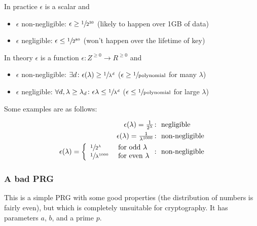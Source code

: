 \documentclass[10pt,a4paper]{report}
\begin{document}
In practice $\epsilon$ is a scalar and
\begin{itemize}
    \item $\epsilon$ non-negligible: $\epsilon \geq \sfrac{1}{2^{30}}$ (likely to happen over 1GB
        of data)
    \item $\epsilon$ negligible: $\epsilon \leq \sfrac{1}{2^{80}}$ (won't happen over the lifetime
        of key)
\end{itemize}

\noindent
In theory $\epsilon$ is a function $\epsilon \colon Z^{\geq 0} \to R^{\geq 0}$ and
\begin{itemize}
    \item $\epsilon$ non-negligible: $\exists d \colon \epsilon(\lambda) \geq \sfrac{1}{\lambda^d}$
        ($\epsilon \geq \sfrac{1}{\text{polynomial}}$ for many $\lambda$)
    \item $\epsilon$ negligible: $\forall d, \lambda \geq \lambda_d \colon \epsilon{\lambda} \leq
        \sfrac{1}{\lambda^d}$ ($\epsilon \leq \sfrac{1}{\text{polynomial}}$ for large $\lambda$)
\end{itemize}

\noindent
Some examples are as follows:

\begin{equation*}
\begin{aligned}
    \epsilon(\lambda) = \tfrac{1}{2^\lambda}      & \colon \text{ negligible}\\
    \epsilon(\lambda) = \tfrac{1}{\lambda^{1000}} & \colon \text { non-negligible}\\
    \epsilon(\lambda) = \left\{
        \begin{array}{ll}
            \sfrac{1}{2^\lambda} & \text{ for odd } \lambda\\
            \sfrac{1}{\lambda^{1000}} & \text{ for even } \lambda
        \end{array}
    \right. & \colon \text { non-negligible}
\end{aligned}
\end{equation*}

\subsubsection*{A bad PRG}

This is a simple PRG with some good properties (the distribution of numbers is fairly even), but
which is completely unsuitable for cryptography. It has parameters $a$, $b$, and a prime $p$.
\end{document}
